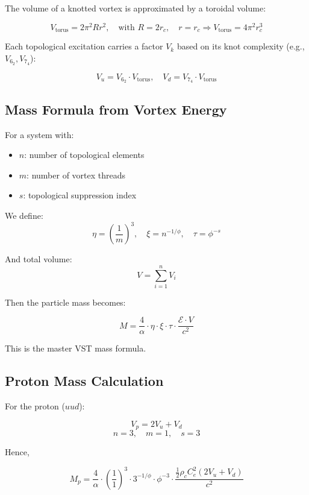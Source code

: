 \documentclass[11pt]{article}
\begin{document}
    The volume of a knotted vortex is approximated by a toroidal volume:

    \[
        V_{\text{torus}} = 2\pi^2 R r^2, \quad \text{with } R = 2r_c, \quad r = r_c \Rightarrow V_{\text{torus}} = 4\pi^2 r_c^3
    \]

    Each topological excitation carries a factor \( V_k \) based on its knot complexity (e.g., \( V_{6_2}, V_{7_4} \)):

    \[
        V_u = V_{6_2} \cdot V_{\text{torus}}, \quad V_d = V_{7_4} \cdot V_{\text{torus}}
    \]

    \subsection{Mass Formula from Vortex Energy}

    For a system with:
    \begin{itemize}
        \item \( n \): number of topological elements
        \item \( m \): number of vortex threads
        \item \( s \): topological suppression index
    \end{itemize}

    We define:
    \[
        \eta = \left( \frac{1}{m} \right)^3, \quad
        \xi = n^{-1/\phi}, \quad
        \tau = \phi^{-s}
    \]

    And total volume:
    \[
        V = \sum_{i=1}^{n} V_i
    \]

    Then the particle mass becomes:

    \[
        M = \frac{4}{\alpha} \cdot \eta \cdot \xi \cdot \tau \cdot \frac{\mathcal{E} \cdot V}{c^2}
    \]

    This is the master VST mass formula.

    \subsection{Proton Mass Calculation}

    For the proton (\( uud \)):

    \[
        V_p = 2 V_u + V_d
    \]
    \[
        n = 3, \quad m = 1, \quad s = 3
    \]

    Hence,

    \[
        M_p = \frac{4}{\alpha} \cdot \left( \frac{1}{1} \right)^3 \cdot 3^{-1/\phi} \cdot \phi^{-3} \cdot \frac{\frac{1}{2} \rho_c C_e^2 (2 V_u + V_d)}{c^2}
    \]
\end{document}

